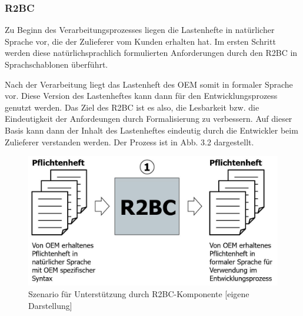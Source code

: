 \documentclass[12pt]{report}
\begin{document}
\subsubsection{R2BC}
Zu Beginn des Verarbeitungsprozesses liegen die Lastenhefte in natürlicher Sprache vor, die der Zulieferer vom Kunden erhalten hat. Im ersten Schritt werden diese natürlichsprachlich formulierten Anforderungen durch den R2BC in Sprachschablonen überführt. 

Nach der Verarbeitung liegt das Lastenheft des OEM somit in formaler Sprache vor. Diese Version des Lastenheftes kann dann für den Entwicklungsprozess genutzt werden. Das Ziel des R2BC ist es also, die Lesbarkeit bzw. die Eindeutigkeit der Anfordeungen durch Formalisierung zu verbessern. Auf dieser Basis kann dann der Inhalt des Lastenheftes eindeutig durch die Entwickler beim Zulieferer verstanden werden. Der Prozess ist in Abb. 3.2 dargestellt.
\begin{figure}[h!]
\begin{center}
\includegraphics[scale=0.5]{Bilder/Prozess-R2BC.jpg}
\caption{Szenario für Unterstützung durch R2BC-Komponente [eigene Darstellung]}
\end{center}
\end{figure}
\end{document}
